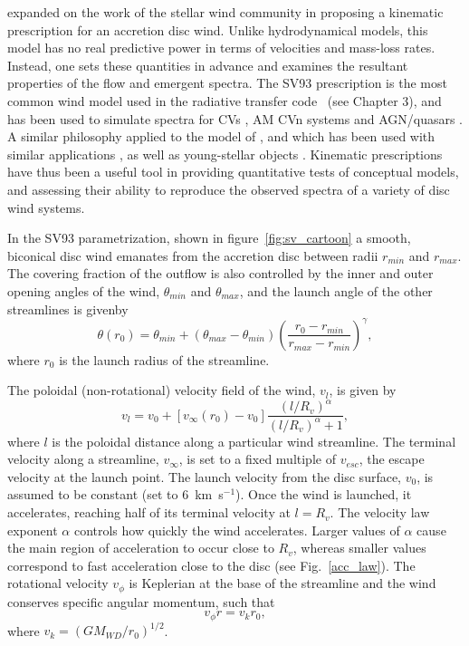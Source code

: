 \citep[][hereafter SV93]{SV93} expanded on the work of the stellar wind community
\citep[e.g.][]{AL85} 
in proposing a kinematic prescription for an accretion disc wind. Unlike 
hydrodynamical models, this model has no real predictive power in terms of velocities
and mass-loss rates. Instead, one sets these quantities in advance and examines the 
resultant properties of the flow and emergent spectra. The SV93 prescription
is the most common wind model used in the radiative transfer code \py\ (see Chapter 3),
and has been used to simulate spectra for CVs \citep[][Chapter 5]{LK02, M15}, 
AM CVn systems \citep{kusterer2014} and AGN/quasars 
\citep[][Chapter 6]{higginbottom2013, M16, yong2016}. 
A similar philosophy applied to the model of \cite{KWD95}, and which has been used
with similar applications \citep{LK02, simlong2008, sim2010}, as 
well as young-stellar objects \citep[YSOs;][]{simmacro2005}.
Kinematic prescriptions have thus been a useful tool in providing quantitative
tests of conceptual models, and assessing their ability to reproduce
the observed spectra of a variety of disc wind systems.

In the SV93 parametrization, shown in figure~\ref{fig:sv_cartoon} 
a smooth, biconical disc wind emanates from the accretion disc between 
radii $r_{min}$ and $r_{max}$. The covering fraction of the outflow is 
also controlled by the inner and outer opening angles of the wind, $\theta_{min}$ and
$\theta_{max}$, and the launch angle of the other streamlines is givenby 
\begin{equation}
\theta(r_0) = \theta_{min} + (\theta_{max} - \theta_{min}) \left(\frac{r_0 - r_{min}}{r_{max} - r_{min}} \right)^{\gamma},
\label{theta}
\end{equation}
where $r_0$ is the launch radius of the streamline.

The poloidal (non-rotational) velocity field of the wind, $v_l$, is given by
\begin{equation}
v_l=v_0+\left[v_{\infty}(r_0)-v_0\right]\frac{\left(l/R_v\right)^{\alpha}}{\left(l/R_v\right)^{\alpha}+1},
\label{v_law}
\end{equation}
where $l$ is the poloidal distance along a particular wind
streamline. The terminal velocity along a streamline, $v_{\infty}$, is
set to a fixed multiple of $v_{esc}$, the escape velocity at the launch
point. The launch velocity from the disc surface, $v_0$, is assumed to
be constant (set to $6$~km~s$^{-1}$). Once the wind is launched, it
accelerates, reaching half of its terminal velocity at $l = R_v$. The
velocity law exponent $\alpha$ controls how quickly the wind
accelerates. Larger values of $\alpha$ cause the main region of 
acceleration to occur close to $R_v$, whereas smaller values
correspond to fast acceleration close to the disc (see
Fig.~\ref{acc_law}). The rotational velocity $v_\phi$ is 
Keplerian at the base of the streamline 
and the wind conserves specific angular momentum, such that
\begin{equation}
v_\phi r = v_{k} r_0,
\label{v_law}
\end{equation}
where $v_{k}=(GM_{WD}/r_0)^{1/2}$.

